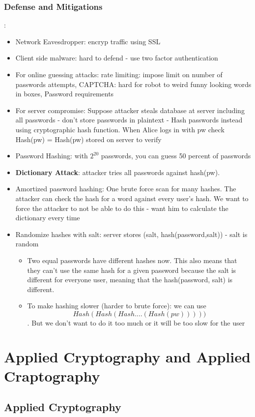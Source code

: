 \documentclass{article}
\begin{document}
\subsubsection{Defense and Mitigations}:
\begin{itemize}
\item Network Eavesdropper: encryp traffic using SSL
\item Client side malware: hard to defend - use two factor authentication
\item For online guessing attacks: rate limiting: impose limit on number of passwords attempts, CAPTCHA: hard for robot to weird funny looking words in boxes, Password requirements
\item For server compromise: Suppose attacker steals database at server including all passwords - don't store passwords in plaintext - Hash passwords instead using cryptographic hash function. When Alice logs in with pw check Hash(pw) = Hash(pw) stored on server to verify
\item Password Hashing: with $2^20$ passwords, you can guess 50 percent of passwords
\item \textbf{Dictionary Attack}: attacker tries all passwords against hash(pw).
\item Amortized password hashing: One brute force scan for many hashes. The attacker can check the hash for a word against every user's hash. We want to force the attacker to not be able to do this - want him to calculate the dictionary every time
\item Randomize hashes with salt: server stores (salt, hash(password,salt)) - salt is random
\begin{itemize}
\item Two equal passwords have different hashes now. This also means that they can't use the same hash for a given password because the salt is different for everyone user, meaning that the hash(password, salt) is different. 
\item To make hashing slower (harder to brute force): we can use $$Hash(Hash(Hash....(Hash(pw)))))$$. But we don't want to do it too much or it will be too slow for the user
\end{itemize}
\end{itemize}

\section{Applied Cryptography and Applied Craptography}
\subsection{Applied Cryptography}
\end{document}
